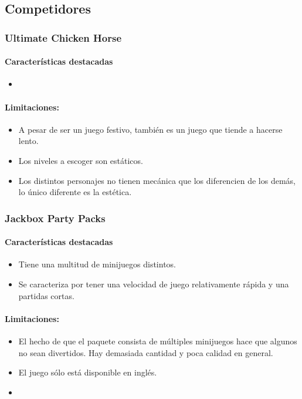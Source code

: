 \subsection{Competidores}

\subsubsection{Ultimate Chicken Horse}

\paragraph{Características destacadas}
\begin{itemize}
    \item 
\end{itemize}

\paragraph{Limitaciones:}
\begin{itemize}
    \item A pesar de ser un juego festivo, también es un juego que tiende a hacerse lento.
    \item Los niveles a escoger son estáticos.
    \item Los distintos personajes no tienen mecánica que los diferencien de los demás, lo único diferente es la estética.
\end{itemize}

\subsubsection{Jackbox Party Packs}

\paragraph{Características destacadas}
\begin{itemize}
    \item Tiene una multitud de minijuegos distintos.
    \item Se caracteriza por tener una velocidad de juego relativamente rápida y una partidas cortas.
\end{itemize}

\paragraph{Limitaciones:}
\begin{itemize}
    \item El hecho de que el paquete consista de múltiples minijuegos hace que algunos no sean divertidos. Hay demasiada cantidad y poca calidad en general.
    \item El juego sólo está disponible en inglés.
    \item 
\end{itemize}

